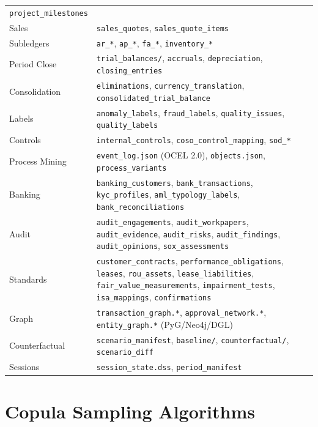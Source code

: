 \begin{table}[ht]
\begin{tabular}{lp{9cm}}
  \texttt{project\_milestones} \\
Sales &
  \texttt{sales\_quotes}, \texttt{sales\_quote\_items} \\
Subledgers &
  \texttt{ar\_*}, \texttt{ap\_*}, \texttt{fa\_*},
  \texttt{inventory\_*} \\
Period Close &
  \texttt{trial\_balances/}, \texttt{accruals},
  \texttt{depreciation}, \texttt{closing\_entries} \\
Consolidation &
  \texttt{eliminations}, \texttt{currency\_translation},
  \texttt{consolidated\_trial\_balance} \\
Labels &
  \texttt{anomaly\_labels}, \texttt{fraud\_labels},
  \texttt{quality\_issues}, \texttt{quality\_labels} \\
Controls &
  \texttt{internal\_controls}, \texttt{coso\_control\_mapping},
  \texttt{sod\_*} \\
Process Mining &
  \texttt{event\_log.json} (OCEL 2.0), \texttt{objects.json},
  \texttt{process\_variants} \\
Banking &
  \texttt{banking\_customers}, \texttt{bank\_transactions},
  \texttt{kyc\_profiles}, \texttt{aml\_typology\_labels},
  \texttt{bank\_reconciliations} \\
Audit &
  \texttt{audit\_engagements}, \texttt{audit\_workpapers},
  \texttt{audit\_evidence}, \texttt{audit\_risks},
  \texttt{audit\_findings}, \texttt{audit\_opinions},
  \texttt{sox\_assessments} \\
Standards &
  \texttt{customer\_contracts}, \texttt{performance\_obligations},
  \texttt{leases}, \texttt{rou\_assets}, \texttt{lease\_liabilities},
  \texttt{fair\_value\_measurements}, \texttt{impairment\_tests},
  \texttt{isa\_mappings}, \texttt{confirmations} \\
Graph &
  \texttt{transaction\_graph.*}, \texttt{approval\_network.*},
  \texttt{entity\_graph.*} (PyG/Neo4j/DGL) \\
Counterfactual &
  \texttt{scenario\_manifest}, \texttt{baseline/},
  \texttt{counterfactual/}, \texttt{scenario\_diff} \\
Sessions &
  \texttt{session\_state.dss}, \texttt{period\_manifest} \\
\bottomrule
\end{tabular}
\end{table}

\section{Copula Sampling Algorithms}
\label{app:copula_algorithms}

